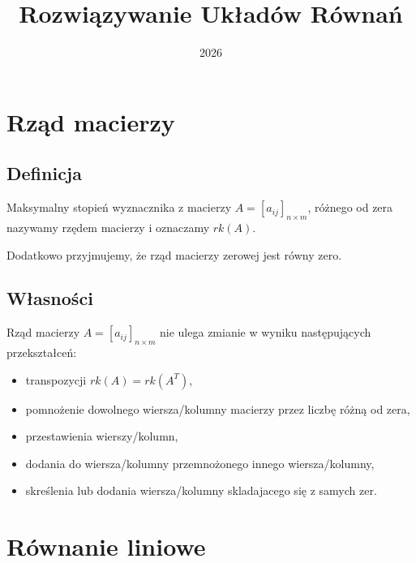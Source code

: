 \documentclass{article}
\title{Rozwiązywanie Układów Równań}
\date{2026}
\begin{document}
\maketitle

\section{Rząd macierzy}
\subsection{Definicja}
Maksymalny stopień wyznacznika z macierzy $A = [a_{ij}]_{n \times m}$,
różnego od zera nazywamy rzędem macierzy i oznaczamy $rk(A)$.

Dodatkowo przyjmujemy, że rząd macierzy zerowej jest równy zero.

\subsection{Własności}
Rząd macierzy $A = [a_{ij}]_{n \times m}$ nie ulega zmianie w wyniku
następujących przekształceń:
\begin{itemize}
    \item transpozycji $rk(A) = rk(A^{T})$,
    \item pomnożenie dowolnego wiersza/kolumny macierzy przez 
        liczbę różną od zera,
    \item przestawienia wierszy/kolumn,
    \item dodania do wiersza/kolumny przemnożonego innego wiersza/kolumny,
    \item skreślenia lub dodania wiersza/kolumny skladajacego się 
        z samych zer.
\end{itemize}

\section{Równanie liniowe}
\end{document}
